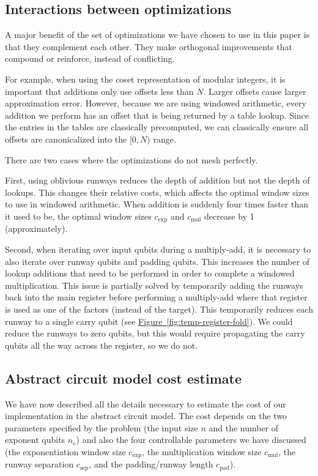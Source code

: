 \documentclass[superscriptaddress,notitlepage,longbibliography]{revtex4-1}
\theoremstyle{definition}
\theoremstyle{definition}
\newcommand{\fig}[1]{\hyperref[fig:#1]{Figure~\ref*{fig:#1}}}
\newcommand{\lenexp}{{n_e}}
\newcommand{\gexp}{{c_{\text{exp}}}}
\newcommand{\gmul}{{c_{\text{mul}}}}
\newcommand{\gsep}{{c_{\text{sep}}}}
\newcommand{\gpad}{{c_{\text{pad}}}}
\begin{document}
\subsection{Interactions between optimizations}

A major benefit of the set of optimizations we have chosen to use in this paper is that they complement each other.
They make orthogonal improvements that compound or reinforce, instead of conflicting.

For example, when using the coset representation of modular integers, it is important that additions only use offsets less than $N$.
Larger offsets cause larger approximation error.
However, because we are using windowed arithmetic, every addition we perform has an offset that is being returned by a table lookup.
Since the entries in the tables are classically precomputed, we can classically ensure all offsets are canonicalized into the $[0, N)$ range.

There are two cases where the optimizations do not mesh perfectly.

First, using oblivious runways reduces the depth of addition but not the depth of lookups.
This changes their relative costs, which affects the optimal window sizes to use in windowed arithmetic.
When addition is suddenly four times faster than it used to be, the optimal window sizes $\gexp$ and $\gmul$ decrease by 1 (approximately).

Second, when iterating over input qubits during a multiply-add, it is necessary to also iterate over runway qubits and padding qubits.
This increases the number of lookup additions that need to be performed in order to complete a windowed multiplication.
This issue is partially solved by temporarily adding the runways back into the main register before performing a multiply-add where that register is used as one of the factors (instead of the target).
This temporarily reduces each runway to a single carry qubit (see \fig{temp-register-fold}).
We could reduce the runways to zero qubits, but this would require propagating the carry qubits all the way across the register, so we do not.


\subsection{Abstract circuit model cost estimate}

We have now described all the details necessary to estimate the cost of our implementation in the abstract circuit model.
The cost depends on the two parameters specified by the problem (the input size $n$ and the number of exponent qubits $\lenexp$) and also the four controllable parameters we have discussed (the exponentiation window size $\gexp$, the multiplication window size $\gmul$, the runway separation $\gsep$, and the padding/runway length $\gpad$).
\end{document}
